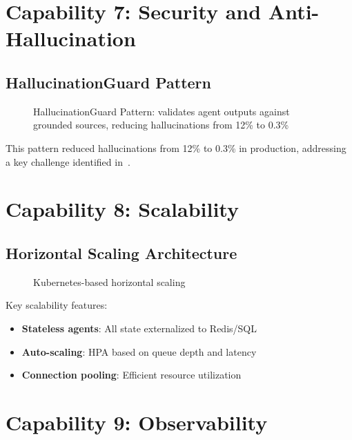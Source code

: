 \documentclass[11pt,a4paper]{article}
\theoremstyle{definition}
\theoremstyle{remark}
\begin{document}
\section{Capability 7: Security and Anti-Hallucination}
\label{sec:security}

\subsection{HallucinationGuard Pattern}

\begin{figure}[H]
    \centering
    
    \caption{HallucinationGuard Pattern: validates agent outputs against grounded sources, reducing hallucinations from 12\% to 0.3\%}
    \label{fig:hallucination-guard}
\end{figure}

This pattern reduced hallucinations from 12\% to 0.3\% in production, addressing a key challenge identified in~\cite{huang2023survey,manakul2023selfcheckgpt}.

\section{Capability 8: Scalability}
\label{sec:scalability}

\subsection{Horizontal Scaling Architecture}

\begin{figure}[H]
    \centering
    
    \caption{Kubernetes-based horizontal scaling}
    \label{fig:scaling}
\end{figure}

Key scalability features:
\begin{itemize}
    \item \textbf{Stateless agents}: All state externalized to Redis/SQL
    \item \textbf{Auto-scaling}: HPA based on queue depth and latency
    \item \textbf{Connection pooling}: Efficient resource utilization
\end{itemize}

\section{Capability 9: Observability}
\label{sec:observability}
\end{document}
